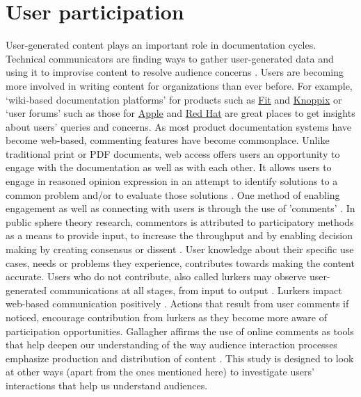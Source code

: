 \section{User participation}
User-generated content plays an important role in documentation cycles. Technical communicators are finding ways to gather user-generated data and using it to improvise content to resolve audience concerns \cite{dubinsky2015products, swarts2018wicked}. Users are becoming more involved in writing content for organizations than ever before. For example, ‘wiki-based documentation platforms’ for products such as \href{http://fit.c2.com/wiki.cgi/}{Fit} and \href{http://knoppix.net/wiki3/index.php?title=Main_Page/}{Knoppix} or ‘user forums’ such as those for \href{https://discussions.apple.com/}{Apple} and \href{https://access.redhat.com/discussions}{Red Hat} are great places to get insights about users’ queries and concerns. As most product documentation systems have become web-based, commenting features have become commonplace. Unlike traditional print or PDF documents, web access offers users an opportunity to engage with the documentation as well as with each other. It allows users to engage in reasoned opinion expression in an attempt to identify solutions to a common problem and/or to evaluate those solutions \cite{habermas1984habermas}. One method of enabling engagement as well as connecting with users is through the use of 'comments' \cite{Garg_2012}. In public sphere theory research, commentors is attributed to participatory methods as a means to provide input, to increase the throughput and by enabling decision making by creating consensus or dissent \cite{chung2008audience, springer2015user}. User knowledge about their specific use cases, needs or problems they experience, contributes towards making the content accurate. Users who do not contribute, also called lurkers may observe user-generated communications at all stages, from input to output \cite{larsson2011interactive}. Lurkers impact web-based communication positively \cite{springer2015user}. Actions that result from user comments if noticed, encourage contribution from lurkers as they become more aware of participation opportunities. Gallagher affirms the use of online comments as tools that help deepen our understanding of the way audience interaction processes emphasize production and distribution of content \cite{gallagher2020update}. This study is designed to look at other ways (apart from the ones mentioned here) to investigate users' interactions that help us understand audiences.

